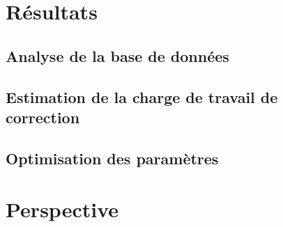 \chapter{Résultats}

	\section{Analyse de la base de données}
	
	\section{Estimation de la charge de travail de correction}
	
	\section{Optimisation des paramètres}
	
	
\chapter{Perspective}